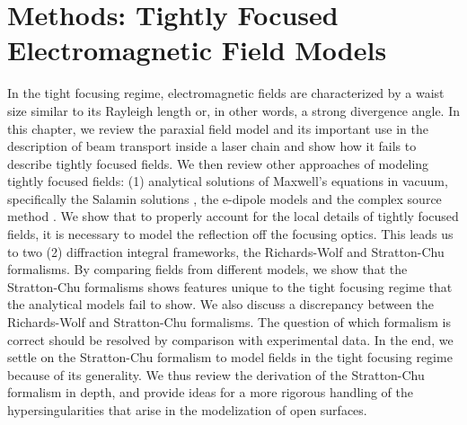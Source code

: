\documentclass[11pt,SymmetricalJury]{inrsthesis/inrsthesis}
\begin{document}

\chapter{Methods: Tightly Focused Electromagnetic Field Models}
\label{chapter:methods}

In the tight focusing regime, electromagnetic fields are characterized by a
waist size similar to its Rayleigh length or, in other words, a strong
divergence angle. In this chapter, we review the paraxial field model and its
important use in the description of beam transport inside a laser chain and show
how it fails to describe tightly focused fields. We then review other approaches
of modeling tightly focused fields: (1) analytical solutions of Maxwell's
equations in vacuum, specifically the Salamin solutions
\cite{Salamin2015a,Salamin2015b}, the e-dipole models \cite{Gonoskov2012} and
the complex source method \cite{April2012}. We show that to properly account for
the local details of tightly focused fields, it is necessary to model the
reflection off the focusing optics. This leads us to two (2) diffraction
integral frameworks, the Richards-Wolf and Stratton-Chu formalisms. By comparing
fields from different models, we show that the Stratton-Chu formalisms shows
features unique to the tight focusing regime that the analytical models fail to
show. We also discuss a discrepancy between the Richards-Wolf and Stratton-Chu
formalisms. The question of which formalism is correct should be resolved by
comparison with experimental data. In the end, we settle on the Stratton-Chu
formalism to model fields in the tight focusing regime because of its
generality. We thus review the derivation of the Stratton-Chu formalism in
depth, and provide ideas for a more rigorous handling of the hypersingularities
that arise in the modelization of open surfaces.
\end{document}
